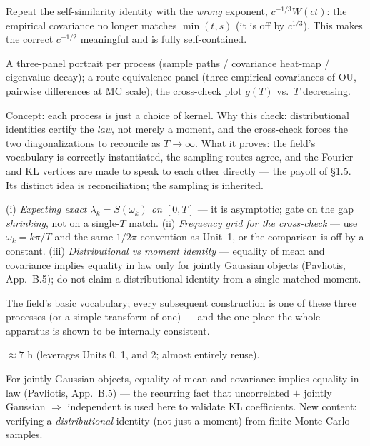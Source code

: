 \documentclass[11pt]{article}
\newcommand{\pav}[1]{{\small\color{hubblue}(Pavliotis, #1)}}
\newenvironment{unitmeta}{%
  \begin{description}[style=sameline,leftmargin=1.4cm,font=\bfseries\color{hubblue}]
}{%
  \end{description}
}
\begin{document}
\begin{unitmeta}
\item[Negative control] Repeat the self-similarity identity with the \emph{wrong} exponent, $c^{-1/3}W(ct)$: the empirical covariance no longer matches $\min(t,s)$ (it is off by $c^{1/3}$). This makes the correct $c^{-1/2}$ meaningful and is fully self-contained.
\item[Artifact] A three-panel portrait per process (sample paths / covariance heat-map / eigenvalue decay); a route-equivalence panel (three empirical covariances of OU, pairwise differences at MC scale); the cross-check plot $g(T)$ vs.\ $T$ decreasing.
\item[README] Concept: each process is just a choice of kernel. Why this check: distributional identities certify the \emph{law}, not merely a moment, and the cross-check forces the two diagonalizations to reconcile as $T\to\infty$. What it proves: the field's vocabulary is correctly instantiated, the sampling routes agree, and the Fourier and KL vertices are made to speak to each other directly --- the payoff of \S1.5. Its distinct idea is reconciliation; the sampling is inherited.
\item[Missteps] (i) \emph{Expecting exact $\lambda_k=S(\omega_k)$ on $[0,T]$} --- it is asymptotic; gate on the gap \emph{shrinking}, not on a single-$T$ match. (ii) \emph{Frequency grid for the cross-check} --- use $\omega_k=k\pi/T$ and the same $1/2\pi$ convention as Unit~1, or the comparison is off by a constant. (iii) \emph{Distributional vs moment identity} --- equality of mean and covariance implies equality in law only for jointly Gaussian objects \pav{App.~B.5}; do not claim a distributional identity from a single matched moment.
\item[Purpose] The field's basic vocabulary; every subsequent construction is one of these three processes (or a simple transform of one) --- and the one place the whole apparatus is shown to be internally consistent.
\item[Effort] $\approx 7$ h (leverages Units 0, 1, and 2; almost entirely reuse).
\item[Prerequisite] For jointly Gaussian objects, equality of mean and covariance implies equality in law \pav{App.~B.5} --- the recurring fact that uncorrelated $+$ jointly Gaussian $\Rightarrow$ independent is used here to validate KL coefficients. New content: verifying a \emph{distributional} identity (not just a moment) from finite Monte Carlo samples.
\end{unitmeta}
\end{document}
